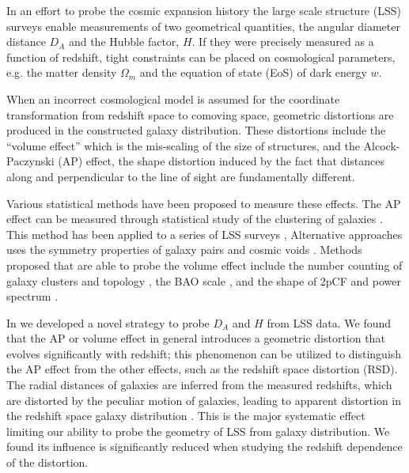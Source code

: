 \documentclass[iop]{emulateapj}
\begin{document}
In an effort to probe the cosmic expansion history the large scale structure (LSS) surveys enable measurements of two geometrical quantities, 
the angular diameter distance $D_A$ and the Hubble factor, $H$. 
If they were precisely measured as a function of redshift, 
tight constraints can be placed on cosmological parameters, 
e.g. the matter density $\Omega_m$ and the equation of state (EoS) of dark energy $w$.

When an incorrect cosmological model is assumed for the coordinate transformation from redshift space to comoving space,
geometric distortions are produced in the constructed galaxy distribution. 
These distortions include the ``volume effect'' which is the mis-scaling of the size of structures,
and the Alcock-Paczynski (AP) effect, the shape distortion induced by the fact that distances along and perpendicular to the line of sight are fundamentally different.

Various statistical methods have been proposed to measure these effects.
The AP effect can be measured through statistical study of the clustering of galaxies \citep{Ballinger1996,Matsubara1996}.
This method has been applied to a series of LSS surveys
\citep{Outram2004,Blake2011,ChuangWang2012,Reid2012,Beutler2013,Linder2013,2014arXiv1407.2257S, Jeong2014,Sutter2014,2014ApJ...781...96L,Alam2016, Beutler2016, Sanchez2016},
Alternative approaches uses the symmetry properties of galaxy pairs \citep{Marinoni2010,Jennings2011,BB2012}
and cosmic voids \citep{Ryden1995,LavausWandelt1995,Sutter2014,Qingqing2016}.
Methods proposed that are able to probe the volume effect include the number counting of 
galaxy clusters \citep{PS1974,VL1996} and topology \citep{topology},
the BAO scale \citep{EHT1998,BG03,SE03},
and the shape of 2pCF and power spectrum \citep{Sanchez2006,Sanchez2009}.





In \cite{Li2014,Li2015,Li2016} we developed a novel strategy to probe $D_A$ and $H$ from LSS data.
We found that the AP or volume effect in general introduces a geometric distortion that evolves significantly with redshift;
this phenomenon can be utilized to distinguish the AP effect from the other effects, such as the redshift space distortion (RSD).
The radial distances of galaxies are inferred from the measured redshifts, which are distorted by the peculiar motion of galaxies, 
leading to apparent distortion in the redshift space galaxy distribution \citep{FOG,Kaiser1987,Ballinger1996}.
This is the major systematic effect limiting our ability to probe the geometry of LSS from galaxy distribution.
We found its influence is significantly reduced when studying the redshift dependence of the distortion.
\end{document}
